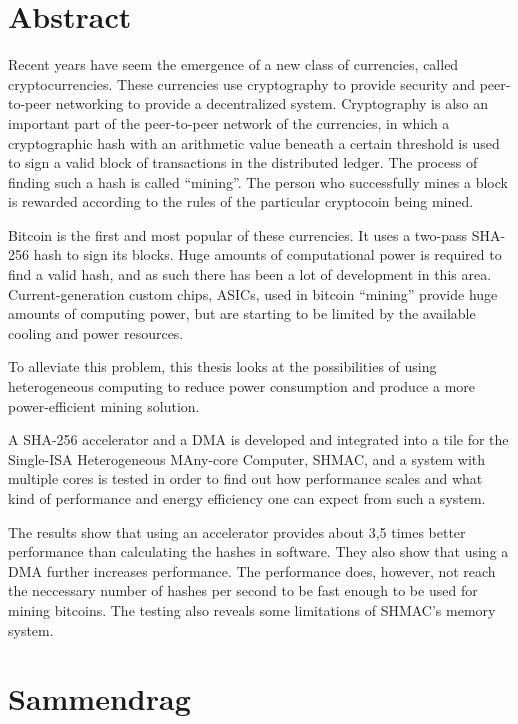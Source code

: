 \chapter*{Abstract}

Recent years have seem the emergence of a new class of currencies, called
cryptocurrencies. These currencies use cryptography to provide security
and peer-to-peer networking to provide a decentralized system. Cryptography
is also an important part of the peer-to-peer network of the currencies,
in which a cryptographic hash with an arithmetic value beneath a certain
threshold is used to sign a valid block of transactions in the distributed
ledger. The process of finding such a hash is called ``mining''. The person
who successfully mines a block is rewarded according to the rules of the
particular cryptocoin being mined.

Bitcoin is the first and most popular of these currencies. It uses a
two-pass SHA-256 hash to sign its blocks. Huge amounts of computational
power is required to find a valid hash, and as such there has been a lot
of development in this area. Current-generation custom chips, ASICs, used
in bitcoin ``mining'' provide huge amounts of computing power, but are starting
to be limited by the available cooling and power resources.

To alleviate this problem, this thesis looks at the possibilities of using
heterogeneous computing to reduce power consumption and produce a more
power-efficient mining solution.

A SHA-256 accelerator and a DMA is developed and integrated into a tile for
the Single-ISA Heterogeneous MAny-core Computer, SHMAC, and a system with
multiple cores is tested in order to find out how performance scales and
what kind of performance and energy efficiency one can expect from such a system.


The results show that using an accelerator provides about 3,5 times better
performance than calculating the hashes in software. They also show that
using a DMA further increases performance. The performance does, however,
not reach the neccessary number of hashes per second to be fast enough to
be used for mining bitcoins. The testing also reveals some limitations of
SHMAC's memory system.

\chapter*{Sammendrag}

